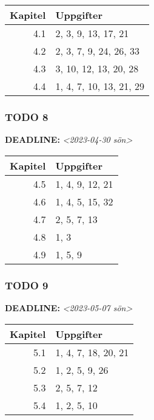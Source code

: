 \documentclass[11pt]{article}
\begin{document}
\begin{center}
\begin{tabular}{rl}
Kapitel & Uppgifter\\[0pt]
\hline
4.1 & 2, 3, 9, 13, 17, 21\\[0pt]
4.2 & 2, 3, 7, 9, 24, 26, 33\\[0pt]
4.3 & 3, 10, 12, 13, 20, 28\\[0pt]
4.4 & 1, 4, 7, 10, 13, 21, 29\\[0pt]
\end{tabular}
\end{center}

\subsubsection{{\bfseries\sffamily TODO} 8}
\label{sec:orgd1d96f8}
\noindent\textbf{DEADLINE:} \textit{<2023-04-30 sön>}\\[0pt]

\begin{center}
\begin{tabular}{rl}
Kapitel & Uppgifter\\[0pt]
\hline
4.5 & 1, 4, 9, 12, 21\\[0pt]
4.6 & 1, 4, 5, 15, 32\\[0pt]
4.7 & 2, 5, 7, 13\\[0pt]
4.8 & 1, 3\\[0pt]
4.9 & 1, 5, 9\\[0pt]
\end{tabular}
\end{center}

\subsubsection{{\bfseries\sffamily TODO} 9}
\label{sec:org68c6bd2}
\noindent\textbf{DEADLINE:} \textit{<2023-05-07 sön>}\\[0pt]

\begin{center}
\begin{tabular}{rl}
Kapitel & Uppgifter\\[0pt]
\hline
5.1 & 1, 4, 7, 18, 20, 21\\[0pt]
5.2 & 1, 2, 5, 9, 26\\[0pt]
5.3 & 2, 5, 7, 12\\[0pt]
5.4 & 1, 2, 5, 10\\[0pt]
\end{tabular}
\end{center}
\end{document}
